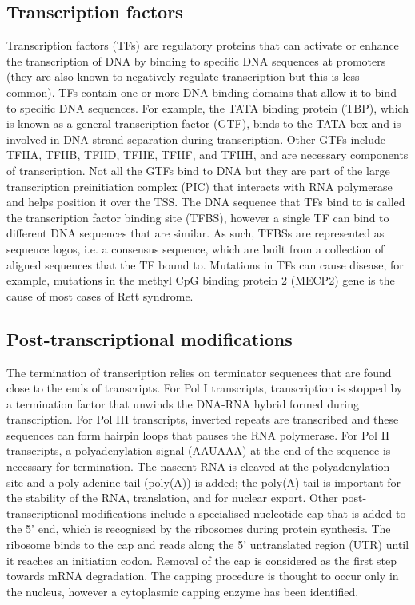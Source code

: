 \subsection{Transcription factors}

Transcription factors (TFs) are regulatory proteins that can activate or enhance the transcription of DNA by binding to specific DNA sequences at promoters (they are also known to negatively regulate transcription but this is less common)\cite{pmid11092823}. TFs contain one or more DNA-binding domains that allow it to bind to specific DNA sequences. For example, the TATA binding protein (TBP), which is known as a general transcription factor (GTF), binds to the TATA box and is involved in DNA strand separation during transcription. Other GTFs include TFIIA, TFIIB, TFIID, TFIIE, TFIIF, and TFIIH, and are necessary components of transcription. Not all the GTFs bind to DNA but they are part of the large transcription preinitiation complex (PIC) that interacts with RNA polymerase and helps position it over the TSS. The DNA sequence that TFs bind to is called the transcription factor binding site (TFBS), however a single TF can bind to different DNA sequences that are similar. As such, TFBSs are represented as sequence logos, i.e. a consensus sequence, which are built from a collection of aligned sequences that the TF bound to. Mutations in TFs can cause disease, for example, mutations in the methyl CpG binding protein 2 (MECP2) gene is the cause of most cases of Rett syndrome.

\subsection{Post-transcriptional modifications}

The termination of transcription relies on terminator sequences that are found close to the ends of transcripts. For Pol I transcripts, transcription is stopped by a termination factor that unwinds the DNA-RNA hybrid formed during transcription. For Pol III transcripts, inverted repeats are transcribed and these sequences can form hairpin loops that pauses the RNA polymerase. For Pol II transcripts, a polyadenylation signal (AAUAAA) at the end of the sequence is necessary for termination\cite{pmid3479794}. The nascent RNA is cleaved at the polyadenylation site and a poly-adenine tail (poly(A)) is added; the poly(A) tail is important for the stability of the RNA, translation, and for nuclear export. Other post-transcriptional modifications include a specialised nucleotide cap that is added to the 5' end, which is recognised by the ribosomes during protein synthesis. The ribosome binds to the cap and reads along the 5' untranslated region (UTR) until it reaches an initiation codon. Removal of the cap is considered as the first step towards mRNA degradation. The capping procedure is thought to occur only in the nucleus, however a cytoplasmic capping enzyme has been identified\cite{pmid22921400}.

